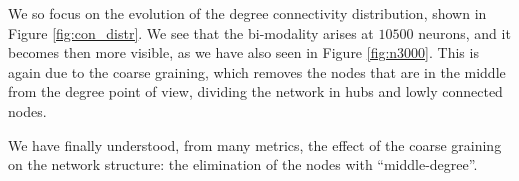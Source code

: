 We so focus on the evolution of the degree connectivity distribution, shown in Figure \ref{fig:con_distr}.
We see that the bi-modality arises at $10500$ neurons, and it becomes then more 
visible, as we have also seen in Figure \ref{fig:n3000}. This is again due to the coarse graining, which
removes the nodes that are in the middle from the degree point of view, dividing the network in hubs
and lowly connected nodes.

We have finally understood, from many metrics, the effect of the coarse graining on the network structure:
the elimination of the nodes with “middle-degree”.